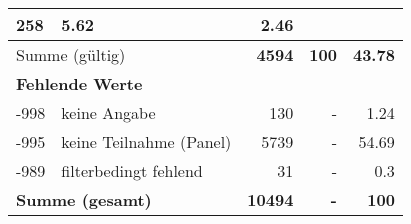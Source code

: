 \begin{longtable}{lXrrr}
       \num{258} &
       \num[round-mode=places,round-precision=2]{5.62} &
         \num[round-mode=places,round-precision=2]{2.46} \\
     \midrule
     \multicolumn{2}{l}{Summe (gültig)} &
       \textbf{\num{4594}} &
     \textbf{\num{100}} &
       \textbf{\num[round-mode=places,round-precision=2]{43.78}} \\
     \multicolumn{5}{l}{\textbf{Fehlende Werte}}\\
       -998 &
       keine Angabe &
         \num{130} &
        - &
         \num[round-mode=places,round-precision=2]{1.24} \\
       -995 &
       keine Teilnahme (Panel) &
         \num{5739} &
        - &
         \num[round-mode=places,round-precision=2]{54.69} \\
       -989 &
       filterbedingt fehlend &
         \num{31} &
        - &
         \num[round-mode=places,round-precision=2]{0.3} \\
     \midrule
     \multicolumn{2}{l}{\textbf{Summe (gesamt)}} &
          \textbf{\num{10494}} &
        \textbf{-} &
        \textbf{\num{100}} \\
     \bottomrule
     \end{longtable}
     
